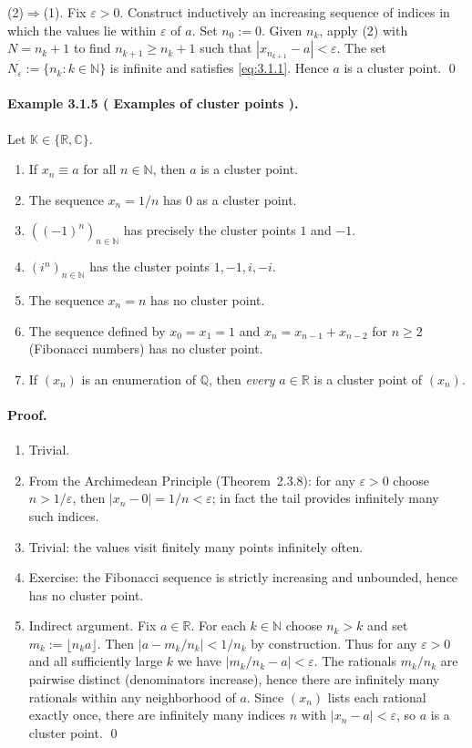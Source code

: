 \documentclass[12pt]{article}
\newcommand{\N}{\mathbb{N}}
\newcommand{\Q}{\mathbb{Q}}
\newcommand{\R}{\mathbb{R}}
\newcommand{\C}{\mathbb{C}}
\newcommand{\K}{\mathbb{K}} %
\newcommand{\eps}{\varepsilon}
\newcommand{\NumberedExample}[3]{%
\paragraph*{Example #1 ( #2 ).} #3\par}
\begin{document}
(2)$\Rightarrow$(1). Fix $\eps>0$. Construct inductively an increasing sequence of indices in which the values lie within $\eps$ of $a$. Set $n_0:=0$. Given $n_k$, apply (2) with $N=n_k+1$ to find $n_{k+1}\ge n_k+1$ such that $|x_{n_{k+1}}-a|<\eps$. The set $N_\eps:=\{ n_k : k\in\N\}$ is infinite and satisfies \eqref{eq:3.1.1}. Hence $a$ is a cluster point. \qed

\NumberedExample{3.1.5}{Examples of cluster points}{Let $\K\in\{\R,\C\}$.
\begin{enumerate}[label={({\arabic*})}, leftmargin=*]
	\item If $x_n\equiv a$ for all $n\in\N$, then $a$ is a cluster point.
	\item The sequence $x_n=1/n$ has $0$ as a cluster point.
	\item $((-1)^n)_{n\in\N}$ has precisely the cluster points $1$ and $-1$.
	\item $(i^n)_{n\in\N}$ has the cluster points $1,-1,i,-i$.
	\item The sequence $x_n=n$ has no cluster point.
	\item The sequence defined by $x_0=x_1=1$ and $x_n=x_{n-1}+x_{n-2}$ for $n\ge2$ (Fibonacci numbers) has no cluster point.
	\item If $(x_n)$ is an enumeration of $\Q$, then \emph{every} $a\in\R$ is a cluster point of $(x_n)$.
\end{enumerate}}

\paragraph{Proof.}
\begin{enumerate}[label={(\arabic*)}, leftmargin=*]
	\item[1.] Trivial.
	\item[2.] From the Archimedean Principle (Theorem~2.3.8): for any $\eps>0$ choose $n>1/\eps$, then $|x_n-0|=1/n<\eps$; in fact the tail provides infinitely many such indices.
	\item[3.-5.] Trivial: the values visit finitely many points infinitely often.
	\item[6.] Exercise: the Fibonacci sequence is strictly increasing and unbounded, hence has no cluster point.
	\item[7.] Indirect argument. Fix $a\in\R$. For each $k\in\N$ choose $n_k>k$ and set $m_k:=\lfloor n_k a\rfloor$. Then $\big| a - m_k/n_k\big|<1/n_k$ by construction. Thus for any $\eps>0$ and all sufficiently large $k$ we have $\big| m_k/n_k - a\big|<\eps$. The rationals $m_k/n_k$ are pairwise distinct (denominators increase), hence there are infinitely many rationals within any neighborhood of $a$. Since $(x_n)$ lists each rational exactly once, there are infinitely many indices $n$ with $|x_n-a|<\eps$, so $a$ is a cluster point. \qed
\end{enumerate}
\end{document}
